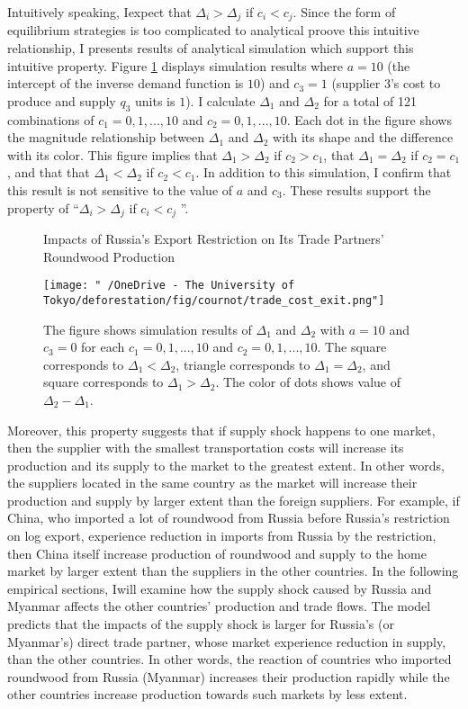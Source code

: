 \documentclass[a4paper,12pt]{article}
\begin{document}
Intuitively speaking, Iexpect that $\Delta_i > \Delta_j$ if $c_i < c_j$. Since the form of equilibrium strategies is too complicated to analytical proove this intuitive relationship, I presents results of analytical simulation which support this intuitive property. Figure \ref{fig:cournot_simulation} displays simulation results where $a = 10$ (the intercept of the inverse demand function is $10$) and $c_3 = 1$ (supplier $3$'s cost to produce and supply $q_3$ units is $1$). I calculate $\Delta_1$ and $\Delta_2$ for a total of 121 combinations of $c_1 = 0, 1, ..., 10$ and $c_2 = 0, 1, ..., 10$. Each dot in the figure shows the magnitude relationship between $\Delta_1$ and $\Delta_2$ with its shape and the difference with its color. This figure implies that $\Delta_1 > \Delta_2$ if $c_2 > c_1$, that $\Delta_1 = \Delta_2$ if $c_2 = c_1$, and that that $\Delta_1 < \Delta_2$ if $c_2 < c_1$. In addition to this simulation, I confirm that this result is not sensitive to the value of $a$ and $c_3$. These results support the property of ``$\Delta_i > \Delta_j$ if $c_i < c_j$ ''. \\

\begin{figure}[H] 
    \centering
    \caption{Impacts of Russia's Export Restriction on Its Trade Partners' Roundwood Production}
    \texttt{[image: "~/OneDrive - The University of Tokyo/deforestation/fig/cournot/trade\_cost\_exit.png"]}
    \caption*{\small{The figure shows simulation results of $\Delta_1$ and $\Delta_2$ with $a = 10$ and $c_3 = 0$ for each $c_1 = 0, 1, ..., 10$ and $c_2 = 0, 1, ..., 10$. The square corresponds to $\Delta_1 < \Delta_2$, triangle corresponds to $\Delta_1 = \Delta_2$, and square corresponds to $\Delta_1 > \Delta_2$. The color of dots shows value of $\Delta_2 - \Delta_1$.}}
    \label{fig:cournot_simulation}
\end{figure}

Moreover, this property suggests that if supply shock happens to one market, then the supplier with the smallest transportation costs will increase its production and its supply to the market to the greatest extent. In other words, the suppliers located in the same country as the market will increase their production and supply by larger extent than the foreign suppliers. For example, if China, who imported a lot of roundwood from Russia before Russia's restriction on log export, experience reduction in imports from Russia by the restriction, then China itself increase production of roundwood and supply to the home market by larger extent than the suppliers in the other countries. In the following empirical sections, Iwill examine how the supply shock caused by Russia and Myanmar affects the other countries' production and trade flows. The model predicts that the impacts of the supply shock is larger for Russia's (or Myanmar's) direct trade partner, whose market experience reduction in supply, than the other countries. In other words, the reaction of countries who imported roundwood from Russia (Myanmar) increases their production rapidly while the other countries increase production towards such markets by less extent.
\end{document}
